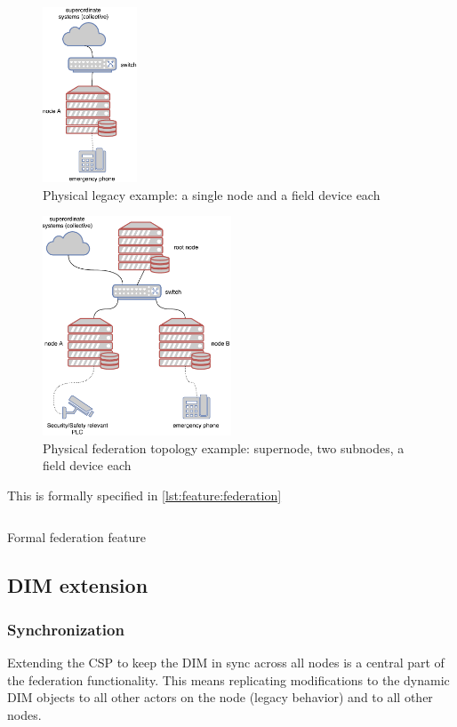 \begin{figure}[]
	\center
	\includegraphics[width=0.25\textwidth]{img/topo_sl_noha.pdf}
	\caption{Physical legacy example: a single node and a field device each}
	\label{fig:topo:sl:noha}
\end{figure}
\begin{figure}[]
	\center
	\includegraphics[width=0.5\textwidth]{img/topo_ml_noha.pdf}
	\caption{Physical federation topology example: supernode, two subnodes, a field device each}
	\label{fig:topo:ml:noha}
\end{figure}

This is formally specified in \autoref{lst:feature:federation}

\begin{listing}
	\inputminted{Gherkin}{listings/features/federation/federation.feature}
	\caption{Formal federation feature}
	\label{lst:feature:federation}
\end{listing}

\subsection{DIM extension}

\subsubsection{Synchronization}
Extending the \gls{CSP} to keep the \gls{DIM} in sync across all nodes is a central
part of the federation functionality. This means replicating modifications to
the dynamic DIM objects to all other actors on the node (legacy behavior) and
to all other nodes.

